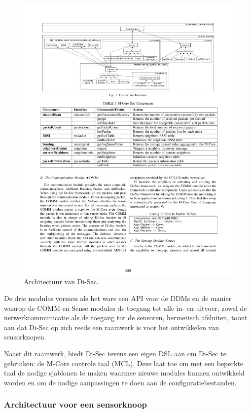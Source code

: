 \begin{figure}[ht]
  \centering
  \includegraphics[width=\linewidth]{resources/di-sec-architecture.pdf}
  \caption{Architectuur van Di-Sec. \cite{valero2012di}}
  \label{fig:di-sec-architecture}
\end{figure}

De drie modules vormen als het ware een API voor de DDMs en de manier waarop de
COMM en Sense modules de toegang tot alle in- en uitvoer, zowel de
netwerkcommunicatie als de toegang tot de sensoren, hermetisch afsluiten, toont
aan dat Di-Sec op zich reeds een raamwerk is voor het ontwikkelen van
sensorknopen.

Naast dit raamwerk, biedt Di-Sec tevens een eigen DSL aan om Di-Sec te
gebruiken: de M-Core controle taal (MCL). Deze laat toe om met een beperkte
taal de nodige sjablonen te maken waarmee nieuwe modules kunnen ontwikkeld
worden en om de nodige aanpassingen te doen aan de configuratiebestanden.

\subsubsection*{Architectuur voor een sensorknoop}
\label{subsubsection:node-architecture}

